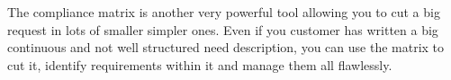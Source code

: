 The compliance matrix is another very powerful tool allowing you to cut a big request in lots of smaller simpler ones. Even if you customer has written a big continuous and not well structured need description, you can use the matrix to cut it, identify requirements within it and manage them all flawlessly.
